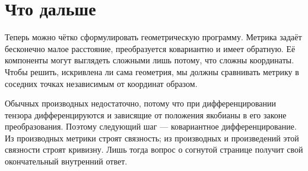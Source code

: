 \section{Что дальше}

Теперь можно чётко сформулировать геометрическую программу. Метрика задаёт бесконечно малое расстояние, преобразуется ковариантно и имеет обратную. Её компоненты могут выглядеть сложными лишь потому, что сложны координаты. Чтобы решить, искривлена ли сама геометрия, мы должны сравнивать метрику в соседних точках независимым от координат образом.

Обычных производных недостаточно, потому что при дифференцировании тензора дифференцируются и зависящие от положения якобианы в его законе преобразования. Поэтому следующий шаг — ковариантное дифференцирование. Из производных метрики строят связность; из производных и произведений этой связности строят кривизну. Лишь тогда вопрос о согнутой странице получит свой окончательный внутренний ответ.
